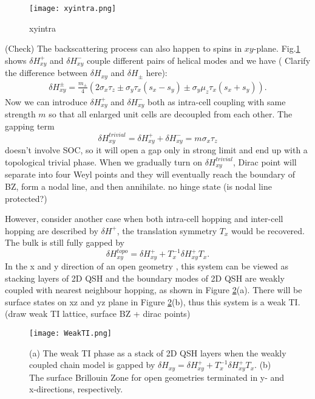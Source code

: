 \begin{figure}[htbp]
    \centering\texttt{[image: xyintra.png]}
    \caption{xyintra}\label{fig:xyintra}
\end{figure}

{\color{red}(Check)} The backscattering process can also happen to spins in $xy$-plane.  Fig.\ref{fig:xyintra} shows $\delta H^+_{xy}$ and $\delta H^-_{xy}$ couple different pairs of helical modes and we have ({\color{red} Clarify the difference between $\delta H_{xy}$ and $\delta H_{\pm}$ here}): 
\begin{equation}
\begin{split}
    \delta H_{xy}^{\pm} = \frac{m_{\pm}}{4} (2 \sigma_x \tau_z \pm \sigma_y \tau_x (s_x - s_y) \pm \sigma_y \mu_z \tau_x (s_x + s_y)).
\end{split}
\end{equation}
Now we can introduce $\delta H^+_{xy}$ and $\delta H^-_{xy}$ both as intra-cell coupling with same strength $m$  so that all enlarged unit cells are decoupled from each other. The gapping term 
\begin{equation}
    \delta H_{xy}^{trivial} =\delta H_{xy}^++\delta H_{xy}^-= m\sigma_x\tau_z
\end{equation}
 doesn't involve SOC, so it will open a gap only in strong limit and end up with a topological trivial phase. When we gradually turn on $\delta H_{xy}^{trivial}$, Dirac point will separate into four Weyl points and they will eventually reach the boundary of BZ, form a nodal line, and then annihilate. {\color{red} no hinge state (is nodal line protected?)}

However, consider another case when both intra-cell hopping and inter-cell hopping are described by $\delta H^+$, the translation symmetry $T_{x}$ would be recovered. The bulk is still fully gapped by 
\begin{equation}
    \delta H_{xy}^{topo}=\delta H^+_{xy}+T_x^{-1}\delta H^+_{xy}T_x.
\end{equation} In the x and y direction of an open geometry , this system can be viewed as stacking layers of 2D QSH and the boundary modes of 2D QSH are weakly coupled with nearest neighbour hopping, as shown in Figure \ref{fig:weakti}(a). There will be surface states on xz and yz plane in Figure \ref{fig:weakti}(b), thus this system is a weak TI.  {\color{red} (draw weak TI lattice, surface BZ + dirac points)}

\begin{figure}[htbp]
    \centering\texttt{[image: WeakTI.png]}
    \caption{(a) The weak TI phase as a stack of 2D QSH layers when the weakly coupled chain model is gapped by $\delta H_{xy}=\delta H^+_{xy}+T_x^{-1}\delta H^+_{xy}T_x$. (b) The surface Brillouin Zone for open geometries terminated in y- and x-directions, respectively.}\label{fig:weakti}
\end{figure}


